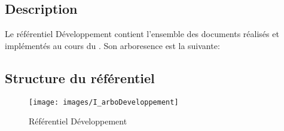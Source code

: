 \subsection{Description}

Le référentiel Développement contient l’ensemble des documents réalisés et implémentés au cours du \picCourt. Son arboresence est la suivante:

\subsection{Structure du référentiel}

\begin{figure}[ht]
         \begin{center}
         \texttt{[image: images/I\_arboDeveloppement]}
         \end{center}
         \caption{Référentiel Développement}
 \end{figure}
